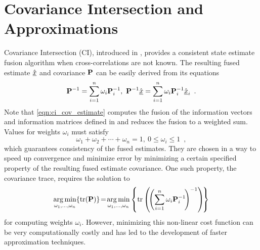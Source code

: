 \documentclass[letterpaper, 10 pt, journal, twoside]{ieeetran}  %
\begin{document}



\section{Covariance Intersection and Approximations} \label{sec:ci}
Covariance Intersection (CI), introduced in \cite{julierNondivergentEstimationAlgorithm1997}, provides a consistent state estimate fusion algorithm when cross-correlations are not known. The resulting fused estimate $\hat{{\underline{x}}}$ and covariance ${{\mathbf{P}}}$ can be easily derived from its equations
\begin{equation}
   {\ensuremath{{\mathbf{P}}}}^{-1}=\sum_{i=1}^{n}\omega_i {{\mathbf{P}}}_i^{-1},\ {{\mathbf{P}}}^{-1} \hat{{\underline{x}}} =\sum_{i=1}^{n}\omega_i {{\mathbf{P}}}_i^{-1} \hat{{\underline{x}}}_i\enspace. \label{eqn:ci_cov_estimate}
\end{equation}
Note that \eqref{eqn:ci_cov_estimate} computes the fusion of the information vectors and information matrices defined in \cite{niehsenInformationFusionBased2002} and reduces the fusion to a weighted sum. Values for weights $\omega_i$ must satisfy
\begin{equation}
   \omega_1 + \omega_2 + \cdots + \omega_n = 1,\ 0 \leq \omega_i \leq 1\enspace, \label{eqn:ci_omega_sum_bound}
\end{equation}
which guarantees consistency of the fused estimates. They are chosen in a way to speed up convergence and minimize error by minimizing a certain specified property of the resulting fused estimate covariance. One such property, the covariance trace, requires the solution to
\begin{equation}
   \operatorname*{arg\,min}_{\omega_1,\dots,\omega_n} \{\operatorname{tr}({{\mathbf{P}}})\}\! =\! \operatorname*{arg\,min}_{\omega_1,\dots,\omega_n} \left\{\operatorname{tr}\left(\!\left(\sum_{i=1}^{n}\omega_i {{\mathbf{P}}}_i^{-1}\!\right)^{-1}\right)\!\right\} \label{eqn:ci_trace_min}
\end{equation}
for computing weights $\omega_i$. However, minimizing this non-linear cost function can be very computationally costly and has led to the development of faster approximation techniques.
\end{document}
